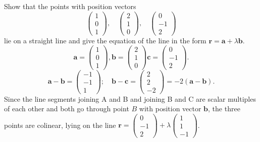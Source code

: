 Show that the points with position vectors
\[
\begin{pmatrix}1\\ 0\\ 1 \end{pmatrix}, \quad \begin{pmatrix} 2\\ 1 \\ 0 \end{pmatrix}, \quad \begin{pmatrix} 0 \\ -1 \\ 2 \end{pmatrix}
\]
lie on a straight line and give the equation of the line in the form $\mathbf{r} = \mathbf{a} + \lambda\mathbf{b}$.
\newline
\[
\mathbf{a} = \begin{pmatrix}
1 \\
0 \\
1
\end{pmatrix}, \mathbf{b} = \begin{pmatrix}
2\\
1\\ 
0
\end{pmatrix} \mathbf{c} = \begin{pmatrix}
0\\
-1\\
2
\end{pmatrix}.
\]
\[
\mathbf{a} - \mathbf{b} = \begin{pmatrix}
-1\\
-1\\
1
\end{pmatrix}; \quad \mathbf{b} - \mathbf{c} = \begin{pmatrix}
2\\
2\\
-2
\end{pmatrix} = -2(\mathbf{a} - \mathbf{b}).
\]
Since the line segments joining A and B and joining B and C are scalar multiples of each other and both go through point $B$ with position vector $\mathbf{b}$, the three points are colinear, lying on the line $\mathbf{r} = \begin{pmatrix} 0\\-1\\2 \end{pmatrix} + \lambda \begin{pmatrix} 1\\1\\-1 \end{pmatrix}$.